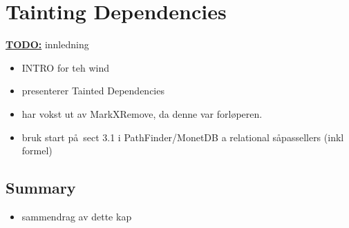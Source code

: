 \chapter{Tainting Dependencies}
\label{sect:translation}
\label{chapter:translation}
\textbf{\underline{\LARGE TODO:}} innledning
\begin{itemize}
  \item INTRO for teh wind
  \item presenterer Tainted Dependencies
  \item har vokst ut av MarkXRemove, da denne var forl\o peren.
  \item bruk start p\aa~sect 3.1 i  PathFinder/MonetDB a relational s\aa passellers (inkl formel)
\end{itemize}














\section{Summary}
\label{sect:trans:summary}
\begin{itemize}
  \item sammendrag av dette kap
\end{itemize}